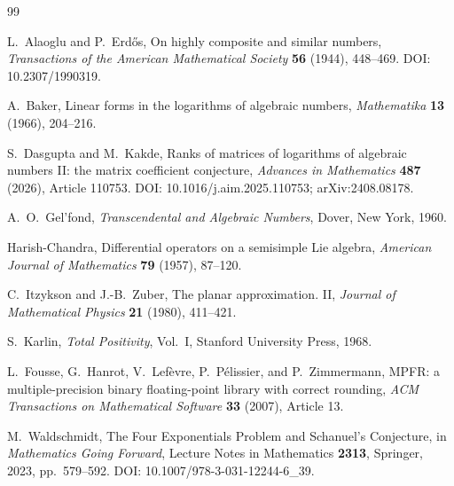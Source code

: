 \documentclass[11pt]{article}
\newcommand{\1}{\mathbf 1}
\theoremstyle{plain}
\theoremstyle{definition}
\theoremstyle{remark}
\begin{document}
\begin{thebibliography}{99}

L.~Alaoglu and P.~Erd\H{o}s,
\newblock On highly composite and similar numbers,
\newblock \emph{Transactions of the American Mathematical Society}
\textbf{56} (1944), 448--469.
\newblock DOI: 10.2307/1990319.

A.~Baker,
\newblock Linear forms in the logarithms of algebraic numbers,
\newblock \emph{Mathematika} \textbf{13} (1966), 204--216.

S.~Dasgupta and M.~Kakde,
\newblock Ranks of matrices of logarithms of algebraic numbers II: the matrix
coefficient conjecture,
\newblock \emph{Advances in Mathematics} \textbf{487} (2026), Article 110753.
\newblock DOI: 10.1016/j.aim.2025.110753; arXiv:2408.08178.

A.~O.~Gel'fond,
\newblock \emph{Transcendental and Algebraic Numbers},
\newblock Dover, New York, 1960.

Harish-Chandra,
\newblock Differential operators on a semisimple Lie algebra,
\newblock \emph{American Journal of Mathematics} \textbf{79} (1957),
87--120.

C.~Itzykson and J.-B.~Zuber,
\newblock The planar approximation. II,
\newblock \emph{Journal of Mathematical Physics} \textbf{21} (1980),
411--421.

S.~Karlin,
\newblock \emph{Total Positivity}, Vol.~I,
\newblock Stanford University Press, 1968.

L.~Fousse, G.~Hanrot, V.~Lef\`evre, P.~P\'elissier, and P.~Zimmermann,
\newblock MPFR: a multiple-precision binary floating-point library with
correct rounding,
\newblock \emph{ACM Transactions on Mathematical Software} \textbf{33}
(2007), Article 13.

M.~Waldschmidt,
\newblock The Four Exponentials Problem and Schanuel's Conjecture,
\newblock in \emph{Mathematics Going Forward}, Lecture Notes in Mathematics
\textbf{2313}, Springer, 2023, pp.~579--592.
\newblock DOI: 10.1007/978-3-031-12244-6\_39.

\end{thebibliography}
\end{document}
